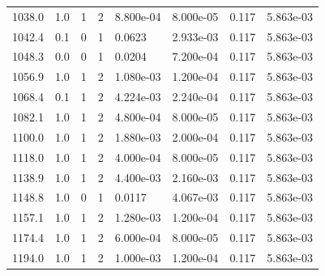 \documentclass[preview]{standalone}
\begin{document}
{{{\begin{tabular}{L{1.2cm}C{1.2cm} C{0.3cm}C{0.5cm} C{1.4cm}C{1.4cm} C{1.4cm}C{1.4cm}}
  1038.0  &   1.0  & 1     &  2 &  8.800e-04  & 8.000e-05  & 0.117 &  5.863e-03   \\ 
  1042.4  &   0.1  & 0     &  1 &  0.0623  & 2.933e-03  & 0.117 &  5.863e-03   \\ 
  1048.3  &   0.0  & 0     &  1 &  0.0204  & 7.200e-04  & 0.117 &  5.863e-03   \\ 
  1056.9  &   1.0  & 1     &  2 &  1.080e-03  & 1.200e-04  & 0.117 &  5.863e-03   \\ 
  1068.4  &   0.1  & 1     &  2 &  4.224e-03  & 2.240e-04  & 0.117 &  5.863e-03   \\ 
  1082.1  &   1.0  & 1     &  2 &  4.800e-04  & 8.000e-05  & 0.117 &  5.863e-03   \\ 
  1100.0  &   1.0  & 1     &  2 &  1.880e-03  & 2.000e-04  & 0.117 &  5.863e-03   \\ 
  1118.0  &   1.0  & 1     &  2 &  4.000e-04  & 8.000e-05  & 0.117 &  5.863e-03   \\ 
  1138.9  &   1.0  & 1     &  2 &  4.400e-03  & 2.160e-03  & 0.117 &  5.863e-03   \\ 
  1148.8  &   1.0  & 0     &  1 &  0.0117  & 4.067e-03  & 0.117 &  5.863e-03   \\ 
  1157.1  &   1.0  & 1     &  2 &  1.280e-03  & 1.200e-04  & 0.117 &  5.863e-03   \\ 
  1174.4  &   1.0  & 1     &  2 &  6.000e-04  & 8.000e-05  & 0.117 &  5.863e-03   \\ 
  1194.0  &   1.0  & 1     &  2 &  1.000e-03  & 1.200e-04  & 0.117 &  5.863e-03   \\ 
\hline 
\end{tabular} 

}}}
\end{document}
